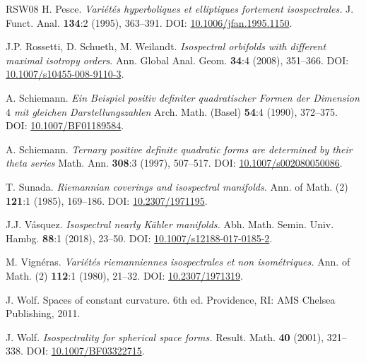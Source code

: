 \documentclass[12pt,a4paper,final]{amsart}
\theoremstyle{plain}
\theoremstyle{definition}
\theoremstyle{remark}
\numberwithin{equation}{section}
\begin{document}
\begin{thebibliography}{RSW08}
    {\sc H. Pesce}.
    {\it Vari\'et\'es hyperboliques et elliptiques fortement isospectrales.}
    J. Funct. Anal. \textbf{134}:2 (1995), 363--391.
    DOI: \href{http://dx.doi.org/10.1006/jfan.1995.1150} {10.1006/jfan.1995.1150}.
    
    {\sc J.P. Rossetti, D. Schueth, M. Weilandt}.
    {\it Isospectral orbifolds with different maximal isotropy orders}.
    Ann. Global Anal. Geom. \textbf{34}:4 (2008), 351--366.
    DOI: \href{http://dx.doi.org/10.1007/s10455-008-9110-3} {10.1007/s10455-008-9110-3}.
    
    {\sc A. Schiemann}.
    {\it Ein {B}eispiel positiv definiter quadratischer {F}ormen der {D}imension {$4$} mit gleichen {D}arstellungszahlen}
    Arch. Math. (Basel) \textbf{54}:4 (1990), 372--375.
    DOI: \href{http://dx.doi.org/10.1007/BF01189584} {10.1007/BF01189584}.
    
    {\sc A. Schiemann}.
    {\it Ternary positive definite quadratic forms are determined by their theta series}
    Math. Ann. \textbf{308}:3 (1997), 507--517.
    DOI: \href{http://dx.doi.org/10.1007/s002080050086} {10.1007/s002080050086}.
    
    {\sc T. Sunada}.
    {\it Riemannian coverings and isospectral manifolds.}
    Ann. of Math. (2) \textbf{121}:1 (1985), 169--186.
    DOI: \href{http://dx.doi.org/10.2307/1971195} {10.2307/1971195}.
    
    {\sc J.J. V\'{a}squez}.
    {\it Isospectral nearly {K}\"{a}hler manifolds.}
    Abh. Math. Semin. Univ. Hambg. \textbf{88}:1 (2018), 23--50.
    DOI: \href{http://dx.doi.org/10.1007/s12188-017-0185-2} {10.1007/s12188-017-0185-2}.
    
    {\sc M. Vign{\'e}ras}.
    {\it Vari\'et\'es riemanniennes isospectrales et non isom\'etriques.}
    Ann. of Math. (2) \textbf{112}:1 (1980), 21--32.
    DOI: \href{http://dx.doi.org/10.2307/1971319} {10.2307/1971319}.
    
    {\sc J. Wolf}.
    Spaces of constant curvature. 6th ed.
    Providence, RI: AMS Chelsea Publishing, 2011.
    
    {\sc J. Wolf}.
    {\it Isospectrality for spherical space forms.}
    Result. Math. \textbf{40} (2001), 321--338.
    DOI: \href{http://dx.doi.org/10.1007/BF03322715} {10.1007/BF03322715}.

\end{thebibliography}
\end{document}
